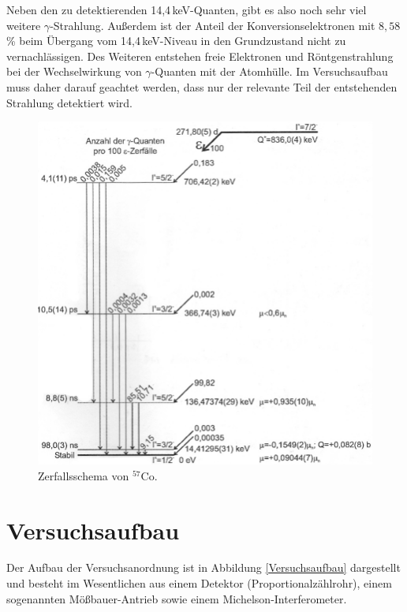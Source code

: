 \documentclass[
a4paper,                %
titlepage=firstiscover, %
captions=tableheading,  %
toc=bibliography,       %
toc=listof,             %
oneside,                %
automark,               %
12pt,                   %
english, ngerman,       %
parskip = half,         %
]{scrartcl}
\begin{document}
Neben den zu detektierenden 14,4\,keV-Quanten, gibt es also noch sehr viel weitere $\gamma$-Strahlung.
Außerdem ist der Anteil der Konversionselektronen mit $8,58\,$\% beim Übergang vom 14,4\,keV-Niveau in den Grundzustand nicht zu vernachlässigen.
Des Weiteren entstehen freie Elektronen und Röntgenstrahlung bei der Wechselwirkung von $\gamma$-Quanten mit der Atomhülle.
Im Versuchsaufbau muss daher darauf geachtet werden, dass nur der relevante Teil der entstehenden Strahlung detektiert wird.    

\begin{figure}[H]
	\centering
	\includegraphics[width=0.9\linewidth]{img/Zerfallsschema}
	\caption{Zerfallsschema von $^{57}$Co.\cite{3}}
	\label{fig:zerfallsschema}
\end{figure}


\newpage


\section{Versuchsaufbau} \label{Aufbau}

Der Aufbau der Versuchsanordnung ist in Abbildung \ref{Versuchsaufbau} dargestellt und besteht im Wesentlichen aus einem Detektor (Proportionalzählrohr), einem sogenannten Mößbauer-Antrieb sowie einem Michelson-Interferometer.
\end{document}

